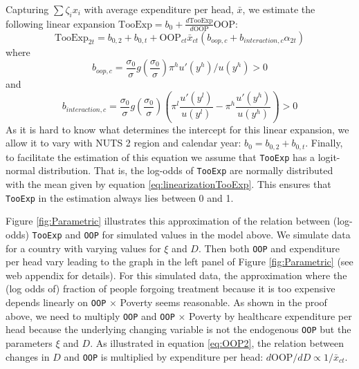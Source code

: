 \documentclass[a4paper,12pt]{article}
\begin{document}
Capturing \(\sum \zeta_i x_i\) with average expenditure per head, \(\bar x\), we estimate the following linear expansion \(\text{TooExp} = b_0 + \frac{d \text{TooExp}}{d \text{OOP}} \text{OOP}\):
\begin{equation}
\label{eq:linearizationTooExp}
\text{TooExp}_{2t} = b_{0,2} + b_{0,t} +  \text{OOP}_{ct} \bar x_{ct} \left( b_{oop,c}+ b_{interaction,c} \alpha_{2t} \right)
\end{equation}
where
\begin{equation}
b_{oop,c} =  \frac{\sigma_0}{\sigma} g(\frac{\sigma_0}{\sigma})\pi^h u'(y^h)/u(y^h) >0
\end{equation}
and
\begin{equation}
b_{interaction,c} =  \frac{\sigma_0}{\sigma} g(\frac{\sigma_0}{\sigma})\left( \pi^l \frac{u'(y^{l})}{u(y^l)}- \pi^h \frac{u'(y^{h})}{u(y^h)}  \right) > 0
\end{equation}
As it is hard to know what determines the intercept for this linear expansion, we allow it to vary with NUTS 2 region and calendar year: \(b_0 = b_{0,2} + b_{0,t}\). Finally, to facilitate the estimation of this equation we assume that \texttt{TooExp} has a logit-normal distribution. That is, the log-odds of \texttt{TooExp} are normally distributed with the mean given by equation \eqref{eq:linearizationTooExp}. This ensures that \texttt{TooExp} in the estimation always lies between 0 and 1.

Figure \ref{fig:Parametric} illustrates this approximation of the relation between (log-odds) \texttt{TooExp} and \texttt{OOP} for simulated values in the model above. We simulate data for a country with varying values for \(\xi\) and \(D\). Then both \texttt{OOP} and expenditure per head vary leading to the graph in the left panel of Figure \ref{fig:Parametric} (see web appendix for details). For this simulated data, the approximation where the (log odds of) fraction of people forgoing treatment because it is too expensive depends linearly on \texttt{OOP} \(\times\) Poverty seems reasonable. As shown in the proof above, we need to multiply \texttt{OOP} and \texttt{OOP} \(\times\) Poverty by healthcare expenditure per head because the underlying changing variable is not the endogenous \texttt{OOP} but the parameters \(\xi\) and \(D\). As illustrated in equation \eqref{eq:OOP2}, the relation between changes in \(D\) and \texttt{OOP} is multiplied by expenditure per head: \(d \text{OOP}/d D \propto 1/\bar{x}_{ct}\).
\end{document}
